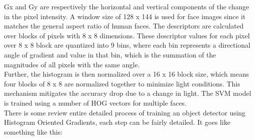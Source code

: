         Gx and Gy are respectively the horizontal and vertical components of the change in the pixel intensity. A window size of 128 x 144 is used for face images since it matches the general aspect ratio of human faces. 
        The descriptors are calculated over blocks of pixels with 8 x 8 dimensions. These descriptor values for each pixel over 8 x 8 block are quantized into 9 bins, where each bin represents a directional angle of gradient 
        and value in that bin, which is the summation of the magnitudes of all pixels with the same angle. \\ 
        \vspace{3mm}
        Further, the histogram is then normalized over a 16 x 16 block size, which means four blocks of 8 x 8 are normalized together to minimize light conditions. This mechanism mitigates the accuracy drop due to a 
        change in light. The SVM model is trained using a number of HOG vectors for multiple faces. \\
        \vspace{3mm}
        There is some review entire detailed process of training an object detector using Histogram Oriented Gradients, each step can be fairly detailed. It goes like something like this:
